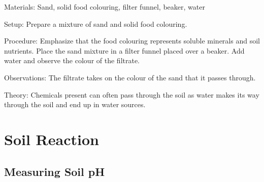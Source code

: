 \begin{multicols}{2}

\begin{description*}
\item[Materials:]{Sand, solid food colouring, filter funnel, beaker, water}
\item[Setup:]{Prepare a mixture of sand and solid food colouring.}
\item[Procedure:]{Emphasize that the food colouring represents soluble minerals and soil nutrients. Place the sand mixture in a filter funnel placed over a beaker. Add water and observe the colour of the filtrate.}
\item[Observations:]{The filtrate takes on the colour of the sand that it passes through.}
\item[Theory:]{Chemicals present can often pass through the soil as water makes its way through the soil and end up in water sources.}
\end{description*}





\section*{Soil Reaction}

\subsection{Measuring Soil pH} 



\end{multicols}
